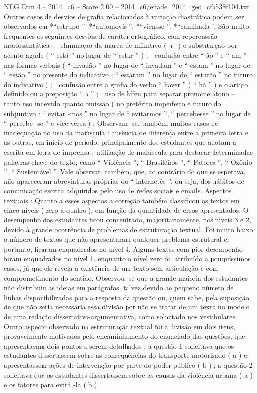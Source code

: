 \begin{textsample}{NEG Dim 4 – 2014\_c6 – Score 2.00 – 2014\_c6/enade\_2014\_geo\_cfb538f104.txt}
Outros casos de desvios de grafia relacionados à variação diastrática podem ser observados em *“estrupo ”, *“automovís ”, *“viensse ”, *“camihada ”.
São muito frequentes os seguintes desvios de caráter ortográfico, com repercussão morfossintática :  eliminação da marca de infinitivo ( -r- ) e substituição por acento agudo ( “ está ” no lugar de “ estar ” ) ;  confusão entre “ ão ” e “ am ” nas formas verbais ( “ invadão ” no lugar de “ invadam ” e “ estam ” no lugar de “ estão ” no presente do indicativo ; “ estaram ” no lugar de “ estarão ” no futuro do indicativo ) ;  confusão entre a grafia do verbo “ haver ” ( “ há ” ) e o artigo definido ou a preposição “ a ” ;  uso de hífen para separar pronome átono – tanto uso indevido quanto omissão ( no pretérito imperfeito e futuro do subjuntivo : “ evitar -mos ” no lugar de “ evitarmos ”, “ percebesse ” no lugar de “ percebe -se ” e vice-versa ) ; Observam -se, também, muitos casos de inadequação no uso da maiúscula : ausência de diferença entre a primeira letra e as outras, em início de período, principalmente dos estudantes que adotam a escrita em letra de imprensa ; utilização de maiúscula para destacar determinadas palavras-chave do texto, como “ Violência ”, “ Brasileiros ”, “ Fatores ”, “ Ozônio ”, “ Sustentável ”.
Vale observar, também, que, ao contrário do que se esperava, não apareceram abreviaturas próprias do “ internetês ”, ou seja, dos hábitos de comunicação escrita adquiridos pelo uso de redes sociais e emails.
Aspectos textuais : Quanto a esses aspectos a correção também classificou os textos em cinco níveis ( zero a quatro ), em função da quantidade de erros apresentados.
O desempenho dos estudantes ficou concentrado, majoritariamente, nos níveis 3 e 2, devido à grande ocorrência de problemas de estruturação textual.
Foi muito baixo o número de textos que não apresentaram qualquer problema estrutural e, portanto, ficaram enquadrados no nível 4.
Alguns textos com pior desempenho foram enquadrados no nível 1, enquanto o nível zero foi atribuído a pouquíssimos casos, já que ele revela a existência de um texto sem articulação e com comprometimento do sentido.
Observou -se que a grande maioria dos estudantes não distribuiu as ideias em parágrafos, talvez devido ao pequeno número de linhas disponibilizadas para a resposta da questão ou, quem sabe, pela suposição de que não seria necessária essa divisão por não se tratar de um texto no modelo de uma redação dissertativo-argumentativa, como solicitado nos vestibulares.
Outro aspecto observado na estruturação textual foi a divisão em dois itens, provavelmente motivados pelo encaminhamento do enunciado das questões, que apresentavam dois pontos a serem detalhados : a questão 1 solicitava que os estudantes dissertassem sobre as consequências do transporte motorizado ( a ) e apresentassem ações de intervenção por parte do poder público ( b ) ; a questão 2 solicitava que os estudantes dissertassem sobre as causas da violência urbana ( a ) e os fatores para evitá -la ( b ).

\end{textsample}

